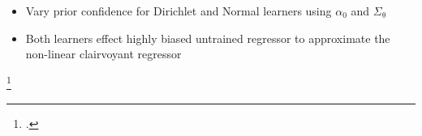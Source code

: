 \documentclass[aspectratio=169]{beamer}
\begin{document}
\begin{frame}
\begin{columns}[T]
\begin{column}{.5\linewidth}
\end{column}

\end{columns}

\vspace{1em}

\begin{itemize}
\item Vary prior confidence for Dirichlet and Normal learners using $\alpha_0$ and $\Sigma_{\uptheta}$
\item Both learners effect highly \alert{biased} untrained regressor to approximate the non-linear clairvoyant regressor
\end{itemize}


\footcitetext{theodoridis-ML}

\end{frame}
\end{document}
